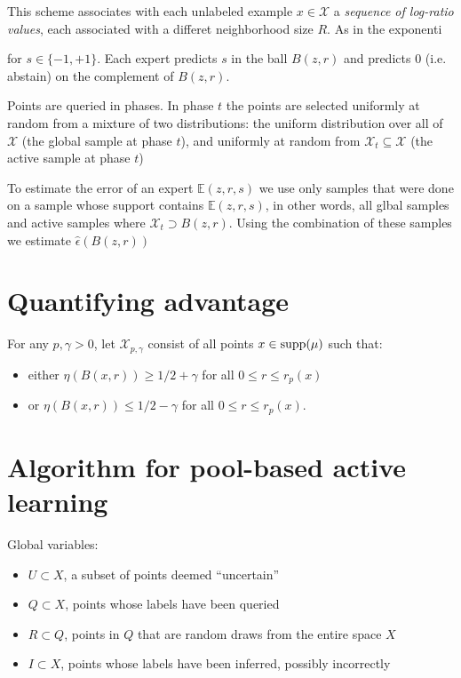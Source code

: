 \documentclass{article}
\def\E{{\mathbb E}}
\def\X{{\mathcal X}}
\def\supp{{\rm supp}}
\begin{document}
This scheme associates with each unlabeled example $x \in \X$ a {\em
  sequence of log-ratio values}, each associated with a differet
neighborhood size $R$. As in the exponenti 


for $s \in \{-1,+1\}$. Each expert predicts $s$ in the ball $B(z,r)$
and predicts $0$ (i.e. abstain) on the complement of $B(z,r)$.

Points are queried in phases. In phase $t$ the points are selected
uniformly at random from a mixture of two distributions: the uniform
distribution over all of $\X$ (the global sample at phase $t$),
and uniformly at random from $\X_t \subseteq \X$ (the active sample at
phase $t$) 

To estimate the error of an expert $\E(z,r,s)$ we use only samples
that were done on a sample whose support contains $\E(z,r,s)$, in
other words, all glbal samples and active samples where $\X_t
\supset B(z,r)$. Using the combination of these samples we estimate $\hat{\epsilon}(B(z,r))$


\section{Quantifying advantage}
For any $p, \gamma> 0$, let $\X_{p, \gamma}$ consist of all points $x \in \supp(\mu)$ such that:
\begin{itemize}
\item either $\eta(B(x,r)) \geq 1/2 + \gamma$ for all $0 \leq r \leq r_p(x)$ 
\item or $\eta(B(x,r)) \leq 1/2 - \gamma$ for all $0 \leq r \leq r_p(x)$.
\end{itemize}


\section{Algorithm for pool-based active learning}

Global variables:
\begin{itemize}
\item $U \subset X$, a subset of points deemed ``uncertain''
\item $Q \subset X$, points whose labels have been queried
\item $R \subset Q$, points in $Q$ that are random draws from the entire space $X$
\item $I \subset X$, points whose labels have been inferred, possibly incorrectly
\end{itemize}
\end{document}
